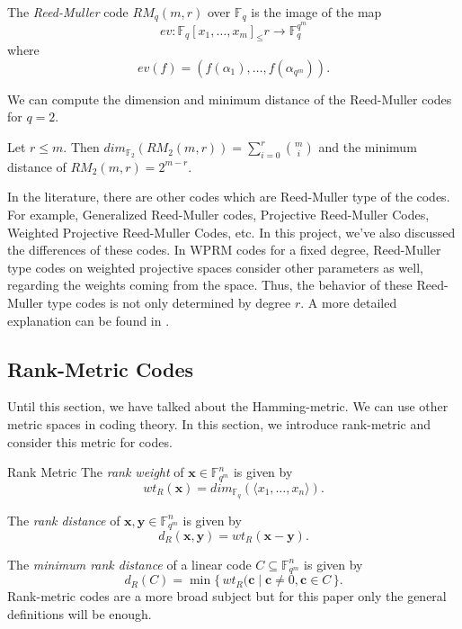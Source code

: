 \begin{definition}
The \textit{Reed-Muller} code $RM_q(m, r)$ over $\mathbb{F}_q$ is the image of the map
\[
ev:\mathbb{F}_q[x_1, \dots, x_m]_\leq r \xrightarrow{} \mathbb{F}_q^{q^m}
\]
where
\[
ev(f) = (f(\alpha_1), \dots, f(\alpha_{q^m})).
\]
\end{definition}

We can compute the dimension and minimum distance of the Reed-Muller codes for $q = 2$.

\begin{proposition}
Let $r \leq m$. Then $dim_{\mathbb{F}_2}(RM_2(m, r)) = 
\sum_{i=0}^r {m\choose i}$ and the minimum distance of $RM_2(m, r) = 2^{m-r}$.
\end{proposition}

In the literature, there are other codes which are Reed-Muller type of the codes. For example, Generalized Reed-Muller codes, Projective Reed-Muller Codes, Weighted Projective Reed-Muller Codes, etc. In this project, we've also discussed the differences of these codes. In WPRM codes for a fixed degree, Reed-Muller type codes on weighted projective spaces consider other parameters as well, regarding the weights coming from the space. Thus, the behavior of these Reed-Muller type codes is not only determined by degree $r$. A more detailed explanation can be found in \cite{WPS2023, WPS2025, Proj}.

\subsection{Rank-Metric Codes}

Until this section, we have talked about the Hamming-metric. We can use other metric spaces in coding theory. In this section, we introduce rank-metric and consider this metric for codes.

\begin{definition}{Rank Metric}
The \textit{rank weight} of $\mathbf{x}\in \mathbb{F}_{q^m}^n$ is given by
\[
wt_R(\mathbf{x}) = dim_{\mathbb{F}_q}(\langle x_1,\dots,x_n\rangle).
\]

The \textit{rank distance} of $\mathbf{x},\mathbf{y}\in \mathbb{F}_{q^m}^n$ is given by
\[
d_R(\mathbf{x},\mathbf{y})=wt_R(\mathbf{x}-\mathbf{y}).
\]

The \textit{minimum rank distance} of a linear code $C\subseteq \mathbb{F}_{q^m}^n$ is given by
\[
d_R(C)=\min\{\,wt_R(\mathbf{c}\mid\mathbf{c}\neq0, \mathbf{c}\in C\,\}.
\]
Rank-metric codes are a more broad subject but for this paper only the general definitions will be enough.    
\end{definition}

